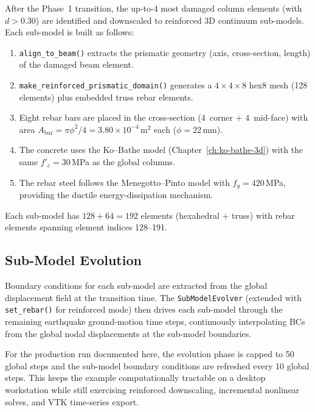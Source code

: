 After the Phase~1 transition, the up-to-4 most damaged column elements
(with $d > 0.30$) are identified and downscaled to reinforced 3D
continuum sub-models.  Each sub-model is built as follows:

\begin{enumerate}
  \item \texttt{align\_to\_beam()} extracts the prismatic geometry
        (axis, cross-section, length) of the damaged beam element.
  \item \texttt{make\_reinforced\_prismatic\_domain()} generates a
        $4 \times 4 \times 8$ hex8 mesh (128 elements) plus embedded
        truss rebar elements.
  \item Eight rebar bars are placed in the cross-section
        (4~corner + 4~mid-face) with area
        $A_{\text{bar}} = \pi\phi^2/4 = 3.80 \times 10^{-4}$\,m$^2$ each
        ($\phi = 22$\,mm).
  \item The concrete uses the Ko--Bathe model (Chapter~\ref{ch:ko-bathe-3d})
        with the same $f'_c = 30$\,MPa as the global columns.
  \item The rebar steel follows the Menegotto--Pinto model with
        $f_y = 420$\,MPa, providing the ductile energy-dissipation mechanism.
\end{enumerate}

Each sub-model has $128 + 64 = 192$ elements (hexahedral + truss)
with rebar elements spanning element indices 128--191.

\subsection{Sub-Model Evolution}
\label{sec:lshaped-submodel-evol}

Boundary conditions for each sub-model are extracted from the global
displacement field at the transition time.  The \texttt{SubModelEvolver}
(extended with \texttt{set\_rebar()} for reinforced mode) then drives
each sub-model through the remaining earthquake ground-motion time steps,
continuously interpolating BCs from the global nodal displacements
at the sub-model boundaries.

For the production run documented here, the evolution phase is capped to
50 global steps and the sub-model boundary conditions are refreshed every
10 global steps.  This keeps the example computationally tractable on a
desktop workstation while still exercising reinforced downscaling,
incremental nonlinear solves, and VTK time-series export.

